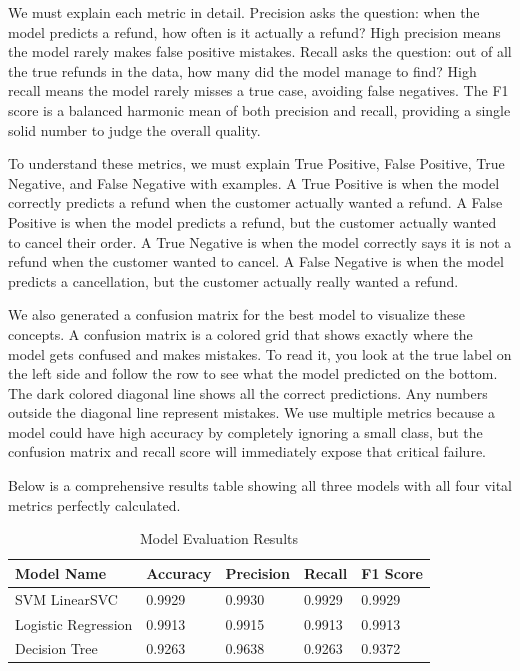 \documentclass[12pt]{article}
\begin{document}
We must explain each metric in detail. Precision asks the question: when the model predicts a refund, how often is it actually a refund? High precision means the model rarely makes false positive mistakes. Recall asks the question: out of all the true refunds in the data, how many did the model manage to find? High recall means the model rarely misses a true case, avoiding false negatives. The F1 score is a balanced harmonic mean of both precision and recall, providing a single solid number to judge the overall quality. 

To understand these metrics, we must explain True Positive, False Positive, True Negative, and False Negative with examples. A True Positive is when the model correctly predicts a refund when the customer actually wanted a refund. A False Positive is when the model predicts a refund, but the customer actually wanted to cancel their order. A True Negative is when the model correctly says it is not a refund when the customer wanted to cancel. A False Negative is when the model predicts a cancellation, but the customer actually really wanted a refund. 

We also generated a confusion matrix for the best model to visualize these concepts. A confusion matrix is a colored grid that shows exactly where the model gets confused and makes mistakes. To read it, you look at the true label on the left side and follow the row to see what the model predicted on the bottom. The dark colored diagonal line shows all the correct predictions. Any numbers outside the diagonal line represent mistakes. We use multiple metrics because a model could have high accuracy by completely ignoring a small class, but the confusion matrix and recall score will immediately expose that critical failure. 

Below is a comprehensive results table showing all three models with all four vital metrics perfectly calculated.

\begin{table}[H]
\centering
\caption{Model Evaluation Results}
\begin{tabular}{|l|l|l|l|l|}
\hline
\textbf{Model Name} & \textbf{Accuracy} & \textbf{Precision} & \textbf{Recall} & \textbf{F1 Score} \\ \hline
SVM LinearSVC & 0.9929 & 0.9930 & 0.9929 & 0.9929 \\ \hline
Logistic Regression & 0.9913 & 0.9915 & 0.9913 & 0.9913 \\ \hline
Decision Tree & 0.9263 & 0.9638 & 0.9263 & 0.9372 \\ \hline
\end{tabular}
\end{table}
\end{document}
